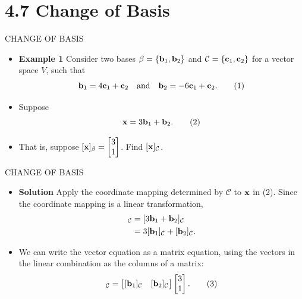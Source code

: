 \section[4.7 Change of Basis]{4.7 Change of Basis}

\begin{frame}[shrink=8]{CHANGE OF BASIS}
\begin{itemize}
\item \textbf{Example 1} Consider two bases $\beta=\{\mathbf{b}_1,\mathbf{b}_2\}$ and $\mathcal C=\{\mathbf{c}_1,\mathbf{c}_2\}$ for a vector space $V$, such that
\begin{equation*}
\mathbf{b}_1=4\mathbf{c}_1+\mathbf{c}_2\quad\text{and}\quad
\mathbf{b}_2=-6\mathbf{c}_1+\mathbf{c}_2. \tag{1}
\end{equation*}
\item Suppose
\begin{equation*}
\mathbf{x}=3\mathbf{b}_1+\mathbf{b}_2. \tag{2}
\end{equation*}
\item That is, suppose $[\mathbf{x}]_{\beta}=\begin{bmatrix}3\\1\end{bmatrix}$. Find $[\mathbf{x}]_{\mathcal C}$.
\end{itemize}
\end{frame}

\begin{frame}[shrink=8]{CHANGE OF BASIS}
\begin{itemize}
\item \textbf{Solution} Apply the coordinate mapping determined by $\mathcal C$ to $\mathbf{x}$ in (2). Since the coordinate mapping is a linear transformation,
\begin{align*}
[\vect x]_{\mathcal C}&=[3\vect b_1+\vect b_2]_{\mathcal C}\\
&=3[\vect b_1]_{\mathcal C}+[\vect b_2]_{\mathcal C}.
\end{align*}
\item We can write the vector equation as a matrix equation, using the vectors in the linear combination as the columns of a matrix:
\begin{equation*}
[\vect x]_{\mathcal C}=
\begin{bmatrix}[\vect b_1]_{\mathcal C}&[\vect b_2]_{\mathcal C}\end{bmatrix}
\begin{bmatrix}3\\1\end{bmatrix}. \tag{3}
\end{equation*}
\end{itemize}
\end{frame}

